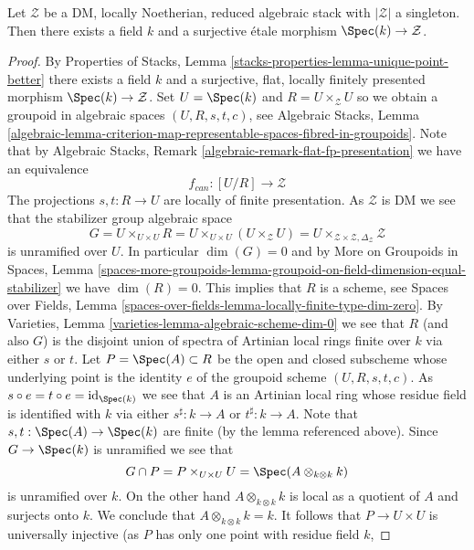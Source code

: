 \begin{lemma}
\label{lemma-DM-residual-gerbe}
Let $\mathcal{Z}$ be a DM, locally Noetherian, reduced algebraic stack
with $|\mathcal{Z}|$ a singleton. Then there exists a field $k$ and
a surjective \'etale morphism $\Spec(k) \to \mathcal{Z}$.
\end{lemma}

\begin{proof}
By
Properties of Stacks, Lemma \ref{stacks-properties-lemma-unique-point-better}
there exists a field $k$ and a surjective, flat, locally finitely presented
morphism $\Spec(k) \to \mathcal{Z}$. Set $U = \Spec(k)$ and
$R = U \times_\mathcal{Z} U$ so we obtain a groupoid in algebraic spaces
$(U, R, s, t, c)$, see
Algebraic Stacks, Lemma
\ref{algebraic-lemma-criterion-map-representable-spaces-fibred-in-groupoids}.
Note that by
Algebraic Stacks, Remark \ref{algebraic-remark-flat-fp-presentation}
we have an equivalence
$$
f_{can} : [U/R] \longrightarrow \mathcal{Z}
$$
The projections $s, t : R \to U$ are locally of finite presentation.
As $\mathcal{Z}$ is DM we see that the stabilizer group algebraic space
$$
G = U \times_{U \times U} R = U \times_{U \times U} (U \times_\mathcal{Z} U) =
U \times_{\mathcal{Z} \times \mathcal{Z}, \Delta_\mathcal{Z}} \mathcal{Z}
$$
is unramified over $U$. In particular $\dim(G) = 0$ and by
More on Groupoids in Spaces, Lemma
\ref{spaces-more-groupoids-lemma-groupoid-on-field-dimension-equal-stabilizer}
we have $\dim(R) = 0$. This implies that $R$ is a scheme, see
Spaces over Fields, Lemma
\ref{spaces-over-fields-lemma-locally-finite-type-dim-zero}.
By
Varieties, Lemma \ref{varieties-lemma-algebraic-scheme-dim-0}
we see that $R$ (and also $G$) is the disjoint union of spectra of
Artinian local rings finite over $k$ via either $s$ or $t$. Let
$P = \Spec(A) \subset R$ be the open and
closed subscheme whose underlying point is the identity $e$ of the groupoid
scheme $(U, R, s, t, c)$. As
$s \circ e = t \circ e = \text{id}_{\Spec(k)}$ we see that $A$
is an Artinian local ring whose residue field is identified with $k$
via either $s^\sharp : k \to A$ or $t^\sharp : k \to A$.
Note that $s, t : \Spec(A) \to \Spec(k)$
are finite (by the lemma referenced above). Since
$G \to \Spec(k)$ is unramified we see that
$$
G \cap P = P \times_{U \times U} U = \Spec(A \otimes_{k \otimes k} k)
$$
is unramified over $k$. On the other hand $A \otimes_{k \otimes k} k$
is local as a quotient of $A$ and surjects onto $k$. We conclude that
$A \otimes_{k \otimes k} k = k$. It follows that $P \to U \times U$
is universally injective (as $P$ has only one point with residue field $k$,

\end{proof}
